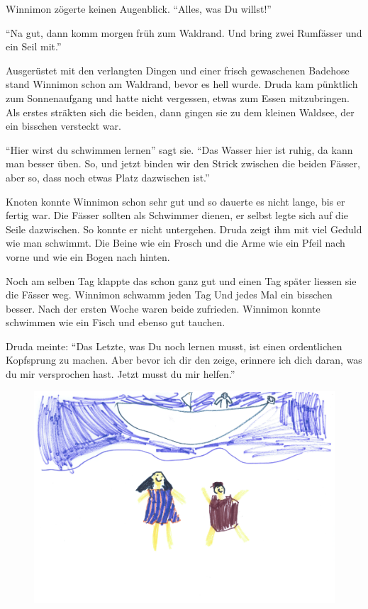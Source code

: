 Winnimon zögerte keinen Augenblick. \enquote{Alles, was Du willst!}

\enquote{Na gut, dann komm morgen früh zum Waldrand. Und bring zwei Rumfässer und ein Seil mit.}

Ausgerüstet mit den verlangten Dingen und einer frisch gewaschenen Badehose stand Winnimon schon am Waldrand, bevor es hell wurde. Druda kam pünktlich zum Sonnenaufgang und hatte nicht vergessen, etwas zum Essen mitzubringen. Als erstes sträkten sich die beiden, dann gingen sie zu dem kleinen Waldsee, der ein bisschen versteckt war.

\enquote{Hier wirst du schwimmen lernen} sagt sie. \enquote{Das Wasser hier ist ruhig, da kann man besser üben. So, und jetzt binden wir den Strick zwischen die beiden Fässer, aber so, dass noch etwas Platz dazwischen ist.}

Knoten konnte Winnimon schon sehr gut und so dauerte es nicht lange, bis er fertig war. Die Fässer sollten als Schwimmer dienen, er selbst legte sich auf die Seile dazwischen. So konnte er nicht untergehen. Druda zeigt ihm mit viel Geduld wie man schwimmt. Die Beine wie ein Frosch und die Arme wie ein Pfeil nach vorne und wie ein Bogen nach hinten.

Noch am selben Tag klappte das schon ganz gut und einen Tag später liessen sie die Fässer weg. Winnimon schwamm jeden Tag Und jedes Mal ein bisschen besser. Nach der ersten Woche waren beide zufrieden. Winnimon konnte schwimmen wie ein Fisch und ebenso gut tauchen.

Druda meinte: \enquote{Das Letzte, was Du noch lernen musst, ist einen ordentlichen Kopfsprung zu machen. Aber bevor ich dir den zeige, erinnere ich dich daran, was du mir versprochen hast. Jetzt musst du mir helfen.}

\begin{figure}[hb]
\centering
\includegraphics[width=.7\textwidth]{bilder/pirat1.pdf}
\end{figure}

